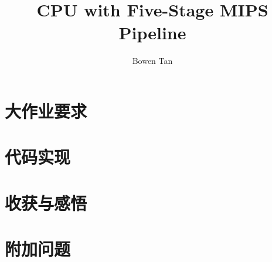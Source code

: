 \documentclass{article}
\begin{document}
    \title{CPU with Five-Stage MIPS Pipeline}
    \author{Bowen Tan}
    \maketitle

    \newpage
    \tableofcontents

	\newpage
	\section{大作业要求}
		

	\section{代码实现}
		

	\section{收获与感悟}
		

	\section{附加问题}
		

	
	
\end{document}
